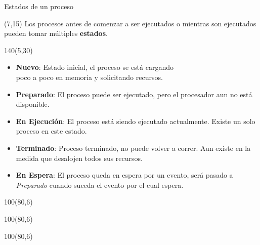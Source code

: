\documentclass[aspectratio=169]{beamer}
\begin{document}
\begin{frame}[fragile]{Estados de un proceso}
    \begin{textblock}{55}(7,15)
    \small
    Los procesos antes de comenzar a ser ejecutados o mientras son ejecutados pueden tomar múltiples \textbf{estados}.\\
    \end{textblock}
    \begin{textblock}{140}(5,30)
    \small
    \begin{itemize}
    \setlength\itemsep{0cm}
    \item<2->[-] \textbf{Nuevo}: Estado inicial, el proceso se está cargando\\ poco a poco en memoria y solicitando recursos.
    \item<3->[-] \textbf{Preparado}: El proceso puede ser ejecutado, pero el procesador aun no está disponible.
    \item<4->[-] \textbf{En Ejecución}: El proceso está siendo ejecutado actualmente. Existe un solo proceso en este estado.
    \item<5->[-] \textbf{Terminado}: Proceso terminado, no puede volver a correr. Aun existe en la medida que desalojen todos sus recursos.
    \end{itemize}
    \begin{itemize}
    \setlength\itemsep{0cm}
    \item<7-> \textbf{En Espera}: El proceso queda en espera por un evento, será pasado a \emph{Preparado} cuando suceda el evento por el cual espera.
    \end{itemize}
    \begin{center}
    \end{center}
    \end{textblock}
    \begin{textblock}{100}(80,6)  \end{textblock} %
    \begin{textblock}{100}(80,6)  \end{textblock} %
    \begin{textblock}{100}(80,6)  \end{textblock} %

\end{frame}
\end{document}
